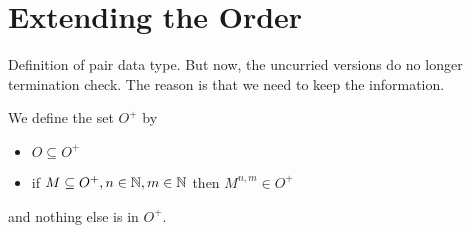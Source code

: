 \section{Extending the Order}
Definition of pair data type.
But now, the uncurried versions do no longer termination check.
The reason is that we need to keep the information.

\newcommand{\coll}{\mathrm{collapse}\;}

\begin{definition}
We define the set $O^{+}$ by   
\begin{itemize}
\item
$ O \subseteq O^{+}$
\item
if $ M \subseteq O^{+} , n \in \mathbb{N} , m \in \mathbb{N} $ then $M^{n,m} \in O^{+}$
\end{itemize}
and nothing else is in $O^{+}$.
\end{definition}

